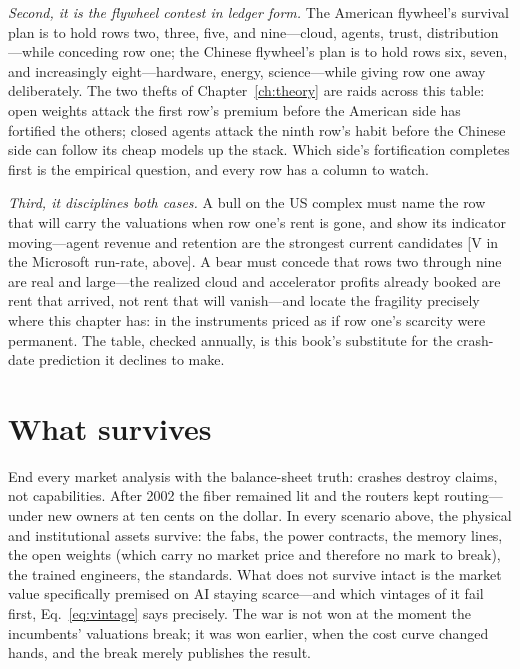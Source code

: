 \emph{Second, it is the flywheel contest in ledger form.} The American flywheel's survival plan is to hold rows two, three, five, and nine---cloud, agents, trust, distribution---while conceding row one; the Chinese flywheel's plan is to hold rows six, seven, and increasingly eight---hardware, energy, science---while giving row one away deliberately. The two thefts of Chapter~\ref{ch:theory} are raids across this table: open weights attack the first row's premium before the American side has fortified the others; closed agents attack the ninth row's habit before the Chinese side can follow its cheap models up the stack. Which side's fortification completes first is the empirical question, and every row has a column to watch.

\emph{Third, it disciplines both cases.} A bull on the US complex must name the row that will carry the valuations when row one's rent is gone, and show its indicator moving---agent revenue and retention are the strongest current candidates [V in the Microsoft run-rate, above]. A bear must concede that rows two through nine are real and large---the realized cloud and accelerator profits already booked are rent that arrived, not rent that will vanish---and locate the fragility precisely where this chapter has: in the instruments priced as if row one's scarcity were permanent. The table, checked annually, is this book's substitute for the crash-date prediction it declines to make.

\section{What survives}

End every market analysis with the balance-sheet truth: crashes destroy claims, not capabilities. After 2002 the fiber remained lit and the routers kept routing---under new owners at ten cents on the dollar. In every scenario above, the physical and institutional assets survive: the fabs, the power contracts, the memory lines, the open weights (which carry no market price and therefore no mark to break), the trained engineers, the standards. What does not survive intact is the market value specifically premised on AI staying scarce---and which vintages of it fail first, Eq.~\eqref{eq:vintage} says precisely. The war is not won at the moment the incumbents' valuations break; it was won earlier, when the cost curve changed hands, and the break merely publishes the result.
